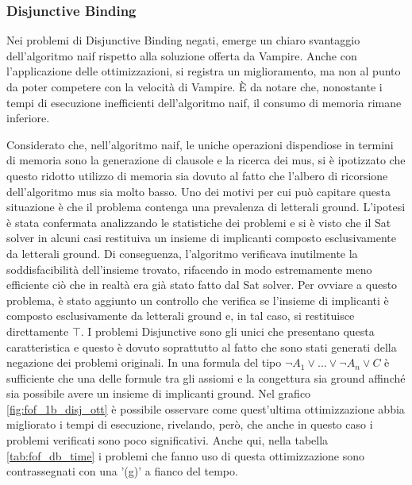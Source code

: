 \documentclass[./main.tex]{subfiles}
\begin{document}
\subsubsection{Disjunctive Binding}

Nei problemi di Disjunctive Binding negati, emerge un chiaro svantaggio dell'algoritmo naif rispetto alla soluzione offerta da Vampire. 
Anche con l'applicazione delle ottimizzazioni, si registra un miglioramento, 
ma non al punto da poter competere con la velocità di Vampire. È da notare che, 
nonostante i tempi di esecuzione inefficienti dell'algoritmo naif, 
il consumo di memoria rimane inferiore.


Considerato che, nell'algoritmo naif, le uniche operazioni dispendiose in termini di 
memoria sono la generazione di clausole e la ricerca dei mus, si 
è ipotizzato che questo ridotto utilizzo di memoria sia dovuto al fatto che
l'albero di ricorsione dell'algoritmo mus sia molto basso.
Uno dei motivi per cui può capitare questa situazione è che il problema contenga 
una prevalenza di letterali ground.
L'ipotesi è stata confermata analizzando le statistiche dei problemi e
si è visto che il Sat solver in alcuni casi restituiva un insieme di implicanti
composto esclusivamente da letterali ground.
Di conseguenza, l'algoritmo verificava inutilmente la soddisfacibilità dell'insieme trovato,
rifacendo in modo estremamente meno efficiente ciò che in realtà era già stato fatto dal Sat solver.
Per ovviare a questo problema, è stato aggiunto un controllo che verifica se l'insieme di implicanti 
è composto esclusivamente da letterali ground e, in tal caso, si restituisce direttamente $\top$.
I problemi Disjunctive sono gli unici che presentano questa caratteristica e questo è 
dovuto soprattutto al fatto che sono stati generati della negazione dei problemi originali.
In una formula del tipo $\lnot A_1 \lor ... \lor \lnot A_n \lor C$ è sufficiente che una delle 
formule tra gli assiomi e la congettura sia ground affinché 
sia possibile avere un insieme di implicanti ground.
Nel grafico \ref{fig:fof_1b_disj_ott} è possibile osservare come quest'ultima 
ottimizzazione abbia migliorato i tempi di esecuzione,
rivelando, però, che anche in questo caso i problemi verificati sono poco significativi.
Anche qui, nella tabella \ref{tab:fof_db_time} i problemi che fanno uso di questa ottimizzazione sono contrassegnati con una '(g)' a fianco del tempo.
\end{document}
